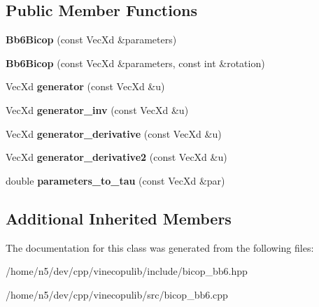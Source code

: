 \subsection*{Public Member Functions}
\begin{DoxyCompactItemize}
\item 
{\bfseries Bb6\+Bicop} (const Vec\+Xd \&parameters)\hypertarget{class_bb6_bicop_afabf95772c3ecb4e999c2e5b00d8319c}{}\label{class_bb6_bicop_afabf95772c3ecb4e999c2e5b00d8319c}

\item 
{\bfseries Bb6\+Bicop} (const Vec\+Xd \&parameters, const int \&rotation)\hypertarget{class_bb6_bicop_a79525991f317ee6c20538f3b8e60780e}{}\label{class_bb6_bicop_a79525991f317ee6c20538f3b8e60780e}

\item 
Vec\+Xd {\bfseries generator} (const Vec\+Xd \&u)\hypertarget{class_bb6_bicop_a9bfb6b16340d34ff8e8eb626a059b78b}{}\label{class_bb6_bicop_a9bfb6b16340d34ff8e8eb626a059b78b}

\item 
Vec\+Xd {\bfseries generator\+\_\+inv} (const Vec\+Xd \&u)\hypertarget{class_bb6_bicop_ae381624eaadfa33e08eaa25eaf713590}{}\label{class_bb6_bicop_ae381624eaadfa33e08eaa25eaf713590}

\item 
Vec\+Xd {\bfseries generator\+\_\+derivative} (const Vec\+Xd \&u)\hypertarget{class_bb6_bicop_aa23265ee279e0cfba8af0594a1cac0e2}{}\label{class_bb6_bicop_aa23265ee279e0cfba8af0594a1cac0e2}

\item 
Vec\+Xd {\bfseries generator\+\_\+derivative2} (const Vec\+Xd \&u)\hypertarget{class_bb6_bicop_ae94d666bdbcf39d973148b7382893653}{}\label{class_bb6_bicop_ae94d666bdbcf39d973148b7382893653}

\item 
double {\bfseries parameters\+\_\+to\+\_\+tau} (const Vec\+Xd \&par)\hypertarget{class_bb6_bicop_ad12d84dddfb2a2aef8f8837a8df9570e}{}\label{class_bb6_bicop_ad12d84dddfb2a2aef8f8837a8df9570e}

\end{DoxyCompactItemize}
\subsection*{Additional Inherited Members}


The documentation for this class was generated from the following files\+:\begin{DoxyCompactItemize}
\item 
/home/n5/dev/cpp/vinecopulib/include/bicop\+\_\+bb6.\+hpp\item 
/home/n5/dev/cpp/vinecopulib/src/bicop\+\_\+bb6.\+cpp\end{DoxyCompactItemize}
